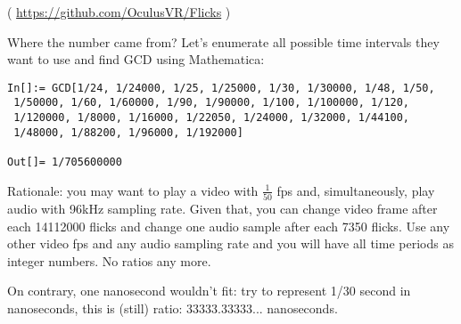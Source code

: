 ( \url{https://github.com/OculusVR/Flicks} )

Where the number came from?
Let's enumerate all possible time intervals they want to use and find GCD using Mathematica:

\begin{lstlisting}
In[]:= GCD[1/24, 1/24000, 1/25, 1/25000, 1/30, 1/30000, 1/48, 1/50, 
 1/50000, 1/60, 1/60000, 1/90, 1/90000, 1/100, 1/100000, 1/120, 
 1/120000, 1/8000, 1/16000, 1/22050, 1/24000, 1/32000, 1/44100, 
 1/48000, 1/88200, 1/96000, 1/192000]

Out[]= 1/705600000
\end{lstlisting}

Rationale: you may want to play a video with $\frac{1}{50}$ fps and, simultaneously, play audio with 96kHz sampling rate.
Given that, you can change video frame after each 14112000 flicks and change one audio sample after each 7350 flicks.
Use any other video fps and any audio sampling rate and you will have all time periods as integer numbers.
No ratios any more.

On contrary, one nanosecond wouldn't fit: try to represent 1/30 second in nanoseconds, this is (still) ratio: 33333.33333... nanoseconds.

